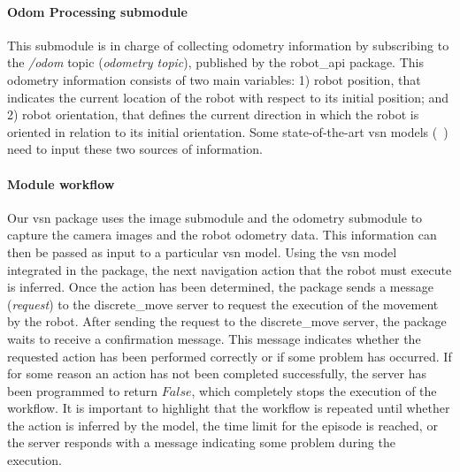 \paragraph*{Odom Processing submodule}\label{par:odom-processing}

This submodule is in charge of collecting odometry information by subscribing to the \textit{/odom} topic (\textit{odometry topic}), published by the robot\_api package.
This odometry information consists of two main variables: 1) robot position, that indicates the current location of the robot with respect to its initial position; and 2) robot orientation, that defines the current direction in which the robot is oriented in relation to its initial orientation.
Some state-of-the-art \acrshort{vsn} models (\eg~\cite{ramrakhya2023}) need to input these two sources of information.

\paragraph*{\textbf{Module workflow}}\label{par:module-workflow}

Our \acrshort{vsn} package uses the image submodule and the odometry submodule to capture the camera images and the robot odometry data.
This information can then be passed as input to a particular \acrshort{vsn} model.
Using the \acrshort{vsn} model integrated in the package, the next navigation action that the robot must execute is inferred.
Once the action has been determined, the package sends a message (\textit{request}) to the discrete\_move server to request the execution of the movement by the robot.
After sending the request to the discrete\_move server, the package waits to receive a confirmation message.
This message indicates whether the requested action has been performed correctly or if some problem has occurred.
If for some reason an action has not been completed successfully, the server has been programmed to return $False$, which completely stops the execution of the workflow.
It is important to highlight that the workflow is repeated until whether the \stopac action is inferred by the model, the time limit for the episode is reached, or the server responds with a message indicating some problem during the execution.

